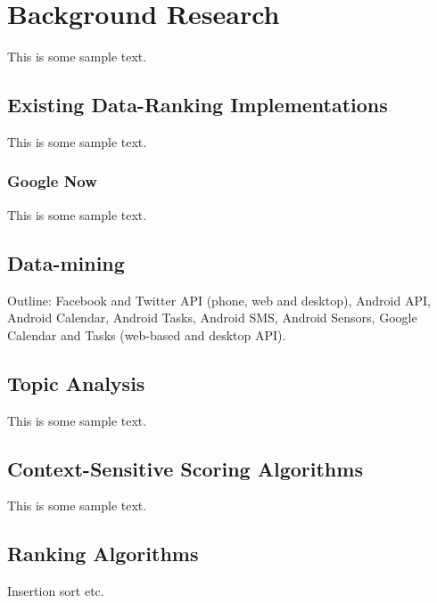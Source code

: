 \chapter{Background Research}

This is some sample text.

\section{Existing Data-Ranking Implementations}

This is some sample text.

\subsection{Google Now}

This is some sample text.
\cite{article1} 


\section{Data-mining}

Outline: Facebook and Twitter API (phone, web and desktop), Android API, Android Calendar, Android Tasks, Android SMS, Android Sensors, Google Calendar and Tasks (web-based and desktop API).

\section{Topic Analysis}

This is some sample text.

\section{Context-Sensitive Scoring Algorithms}

This is some sample text.

\section{Ranking Algorithms}

Insertion sort etc.
